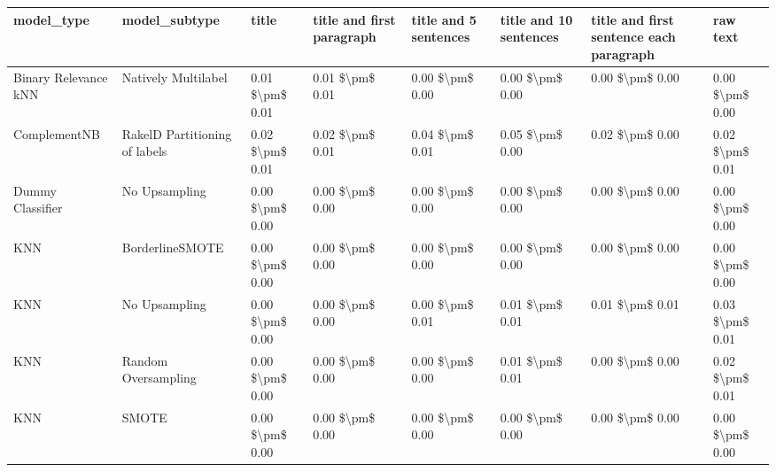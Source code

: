 \begin{tabular}{llllllll}
\toprule
                     model\_type &                 model\_subtype &           title & title and first paragraph & title and 5 sentences & title and 10 sentences & title and first sentence each paragraph &            raw text \\
\midrule
           Binary Relevance kNN &           Natively Multilabel & 0.01 \$\textbackslash pm\$ 0.01 &           0.01 \$\textbackslash pm\$ 0.01 &       0.00 \$\textbackslash pm\$ 0.00 &        0.00 \$\textbackslash pm\$ 0.00 &                         0.00 \$\textbackslash pm\$ 0.00 &     0.00 \$\textbackslash pm\$ 0.00 \\
                   ComplementNB & RakelD Partitioning of labels & 0.02 \$\textbackslash pm\$ 0.01 &           0.02 \$\textbackslash pm\$ 0.01 &       0.04 \$\textbackslash pm\$ 0.01 &        0.05 \$\textbackslash pm\$ 0.00 &                         0.02 \$\textbackslash pm\$ 0.00 &     0.02 \$\textbackslash pm\$ 0.01 \\
               Dummy Classifier &                 No Upsampling & 0.00 \$\textbackslash pm\$ 0.00 &           0.00 \$\textbackslash pm\$ 0.00 &       0.00 \$\textbackslash pm\$ 0.00 &        0.00 \$\textbackslash pm\$ 0.00 &                         0.00 \$\textbackslash pm\$ 0.00 &     0.00 \$\textbackslash pm\$ 0.00 \\
                            KNN &               BorderlineSMOTE & 0.00 \$\textbackslash pm\$ 0.00 &           0.00 \$\textbackslash pm\$ 0.00 &       0.00 \$\textbackslash pm\$ 0.00 &        0.00 \$\textbackslash pm\$ 0.00 &                         0.00 \$\textbackslash pm\$ 0.00 &     0.00 \$\textbackslash pm\$ 0.00 \\
                            KNN &                 No Upsampling & 0.00 \$\textbackslash pm\$ 0.00 &           0.00 \$\textbackslash pm\$ 0.00 &       0.00 \$\textbackslash pm\$ 0.01 &        0.01 \$\textbackslash pm\$ 0.01 &                         0.01 \$\textbackslash pm\$ 0.01 &     0.03 \$\textbackslash pm\$ 0.01 \\
                            KNN &           Random Oversampling & 0.00 \$\textbackslash pm\$ 0.00 &           0.00 \$\textbackslash pm\$ 0.00 &       0.00 \$\textbackslash pm\$ 0.00 &        0.01 \$\textbackslash pm\$ 0.01 &                         0.00 \$\textbackslash pm\$ 0.00 &     0.02 \$\textbackslash pm\$ 0.01 \\
                            KNN &                         SMOTE & 0.00 \$\textbackslash pm\$ 0.00 &           0.00 \$\textbackslash pm\$ 0.00 &       0.00 \$\textbackslash pm\$ 0.00 &        0.00 \$\textbackslash pm\$ 0.00 &                         0.00 \$\textbackslash pm\$ 0.00 &     0.00 \$\textbackslash pm\$ 0.00 \\

\end{tabular}
